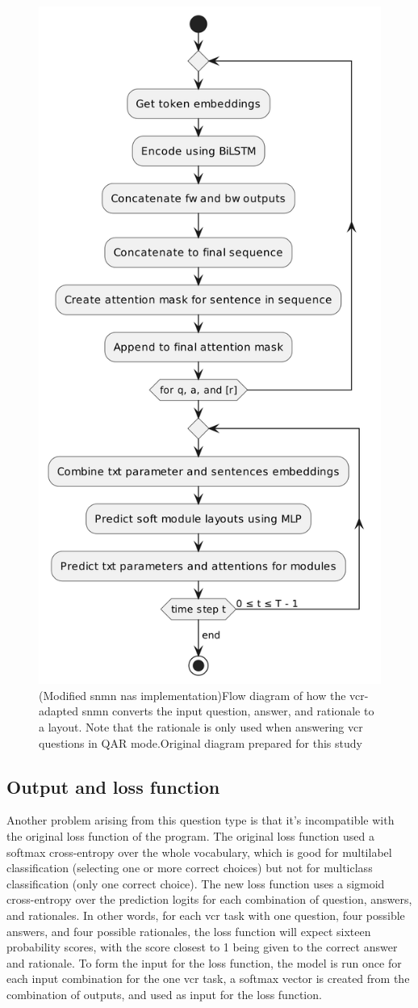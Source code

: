 \begin{figure}[htbp]
    \centering
    \includegraphics[width=.55\textwidth,keepaspectratio]{content/chapters/methodology/model_adaptation/figures/controller-layout-vcr-snmn.png}
    \captionsource(Modified \gls{snmn} \gls{nas} implementation){Flow diagram of how the \gls{vcr}-adapted \gls{snmn} converts the input question, answer, and rationale to a layout. Note that the rationale is only used when answering \gls{vcr} questions in QAR mode.\label{fig:vcr_snmn_input_unit}}{Original diagram prepared for this study}
\end{figure}

\subsection{Output and loss function}
\label{subsec:output_and_loss_function}

Another problem arising from this question type is that it's incompatible with the original loss function of the program.
The original loss function used a softmax cross-entropy over the whole vocabulary, which is good for multilabel classification (selecting one or more correct choices) but not for multiclass classification (only one correct choice).
The new loss function uses a sigmoid cross-entropy over the prediction \glspl{logit} for each combination of question, answers, and rationales.
In other words, for each \gls{vcr} task with one question, four possible answers, and four possible rationales, the loss function will expect sixteen probability scores, with the score closest to 1 being given to the correct answer and rationale.
To form the input for the loss function, the model is run once for each input combination for the one \gls{vcr} task, a softmax vector is created from the combination of outputs, and used as input for the loss function.
